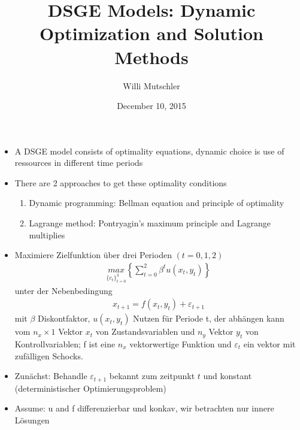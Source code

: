 \documentclass[smaller,compress]{beamer}  %
\begin{document}
\author[Willi Mutschler]{Willi Mutschler}
\date{December 10, 2015}
\subject{Dynamic Optimization}
\title{DSGE Models: Dynamic Optimization and Solution Methods}
\subtitle{}

\begin{frame}
\titlepage
\end{frame}

\begin{frame}
  \begin{itemize}
    \item A DSGE model consists of optimality equations, dynamic choice is use of ressources in different time periods
    \item There are 2 approaches to get these optimality conditions
    \begin{enumerate}
      \item Dynamic programming: Bellman equation and principle of optimality
      \item Lagrange method: Pontryagin's maximum principle and Lagrange multiplies
    \end{enumerate}
  \end{itemize}
\end{frame}

\begin{frame}
  \begin{itemize}
    \item Maximiere Zielfunktion über drei Perioden $(t=0,1,2)$
    \begin{align}
      \underset{\{c_t\}_{t=0}^3}{max}\left\{\sum_{t=0}^2 \beta^t u(x_t,y_t) \right\}
    \end{align}
    unter der Nebenbedingung
    \begin{align}
      x_{t+1} = f(x_t,y_t) + \varepsilon_{t+1}
    \end{align}
    mit $\beta$ Diskontfaktor, $u(x_t,y_t)$ Nutzen für Periode t, der abhängen kann vom $n_x\times 1$ Vektor $x_t$ von Zustandsvariablen und $n_y$ Vektor $y_t$ von Kontrollvariablen; f ist eine $n_x$ vektorwertige Funktion und $\varepsilon_t$ ein vektor mit zufälligen Schocks.
    \item Zunächst: Behandle $\varepsilon_{t+1}$ bekannt zum zeitpunkt $t$ und konstant (deterministischer Optimierungsproblem)
    \item Assume: u and f differenzierbar und konkav, wir betrachten nur innere Lösungen
  \end{itemize}
\end{frame}
\end{document}
